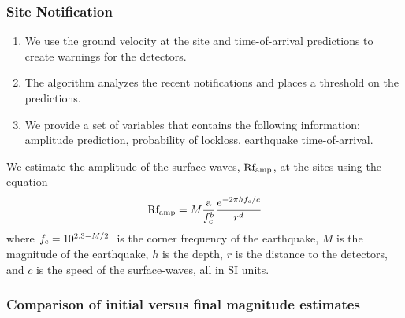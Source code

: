 \documentclass[ignorenonframetext,t,10pt]{beamer}
\begin{document}
\begin{frame}
\frametitle{Site Notification}

  \begin{enumerate}
\item We use the ground velocity at the site and time-of-arrival predictions to create warnings for the detectors.
\item The algorithm analyzes the recent notifications and places a threshold on the predictions.
\item We provide a set of variables that contains the following information: amplitude prediction, probability of lockloss, earthquake time-of-arrival.
  \end{enumerate}
  
We estimate the amplitude of the surface waves, $\rm Rf_{amp}$, at the sites using the equation
\begin{equation}
{\rm Rf_{amp}} = M \frac{\rm a}{f_c^{b}} \frac{e^{-2 \pi h f_{\rm c}/c}}{r^{d}}
\label{eq:Rfamp} 
\end{equation}
where $f_{\rm c} = 10^{2.3-M/2}\,\rm$ is the corner frequency of the earthquake,  $M$ is the magnitude of the earthquake, $h$ is the depth, $r$ is the distance to the detectors, and $c$ is the speed of the surface-waves, all in SI units.  
  
\end{frame}

\begin{frame}
  \frametitle{Comparison of initial versus final magnitude estimates}
\begin{center}
\begin{figure}[hbtp!]
\end{figure}
\end{center}
\end{frame}
\end{document}

